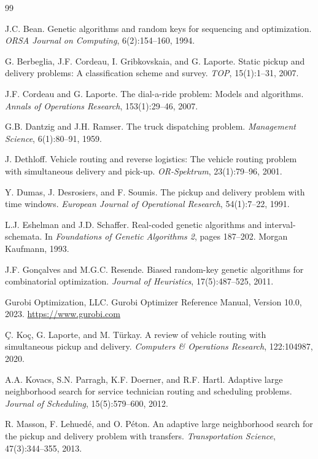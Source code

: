 \documentclass{article}
\begin{document}
%

\begin{thebibliography}{99}

J.C. Bean.
Genetic algorithms and random keys for sequencing and optimization.
{\em ORSA Journal on Computing}, 6(2):154--160, 1994.

G. Berbeglia, J.F. Cordeau, I. Gribkovskaia, and G. Laporte.
Static pickup and delivery problems: A classification scheme and survey.
{\em TOP}, 15(1):1--31, 2007.

J.F. Cordeau and G. Laporte.
The dial-a-ride problem: Models and algorithms.
{\em Annals of Operations Research}, 153(1):29--46, 2007.

G.B. Dantzig and J.H. Ramser.
The truck dispatching problem.
{\em Management Science}, 6(1):80--91, 1959.

J. Dethloff.
Vehicle routing and reverse logistics: The vehicle routing problem with simultaneous delivery and pick-up.
{\em OR-Spektrum}, 23(1):79--96, 2001.

Y. Dumas, J. Desrosiers, and F. Soumis.
The pickup and delivery problem with time windows.
{\em European Journal of Operational Research}, 54(1):7--22, 1991.

L.J. Eshelman and J.D. Schaffer.
Real-coded genetic algorithms and interval-schemata.
In {\em Foundations of Genetic Algorithms 2}, pages 187--202. Morgan Kaufmann, 1993.

J.F. Gon\c{c}alves and M.G.C. Resende.
Biased random-key genetic algorithms for combinatorial optimization.
{\em Journal of Heuristics}, 17(5):487--525, 2011.

Gurobi Optimization, LLC.
Gurobi Optimizer Reference Manual, Version 10.0, 2023.
\url{https://www.gurobi.com}

\c{C}. Ko\c{c}, G. Laporte, and M. T\"{u}rkay.
A review of vehicle routing with simultaneous pickup and delivery.
{\em Computers \& Operations Research}, 122:104987, 2020.

A.A. Kovacs, S.N. Parragh, K.F. Doerner, and R.F. Hartl.
Adaptive large neighborhood search for service technician routing and scheduling problems.
{\em Journal of Scheduling}, 15(5):579--600, 2012.

R. Masson, F. Lehued{\'e}, and O. P{\'e}ton.
An adaptive large neighborhood search for the pickup and delivery problem with transfers.
{\em Transportation Science}, 47(3):344--355, 2013.


\end{thebibliography}
\end{document}
